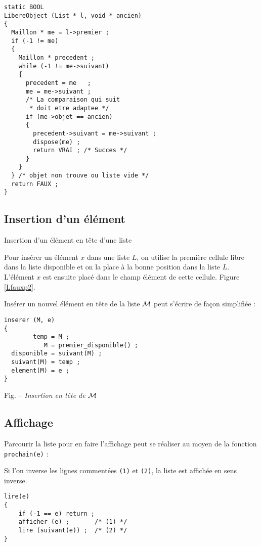 \begin{multicols}{2}
\begin{verbatim}  
static BOOL
LibereObject (List * l, void * ancien)
{   
  Maillon * me = l->premier ;
  if (-1 != me)
  {
    Maillon * precedent ;
    while (-1 != me->suivant)
    {
      precedent = me   ;
      me = me->suivant ;
      /* La comparaison qui suit
       * doit etre adaptee */
      if (me->objet == ancien)
      {
        precedent->suivant = me->suivant ;
        dispose(me) ;
        return VRAI ; /* Succes */
      }
    }
  } /* objet non trouve ou liste vide */
  return FAUX ;
}   \end{verbatim} 


\subsection*{Insertion d'un \'el\'ement}

 {Insertion d'un \'el\'ement en t\^ete d'une
liste}

      Pour ins\'erer un \'el\'ement $x$ dans une liste $L$, on utilise la
    premi\`ere cellule libre dans la liste disponible et on la place \`a la
    bonne position dans la liste $L$.  L'\'el\'ement $x$ est ensuite plac\'e
    dans le champ \'el\'ement de cette cellule. Figure \ref{Lfauxp2}.

	  Ins\'erer un nouvel \'el\'ement en t\^ete de la liste ${\cal M}$ peut
          s'\'ecrire de fa\c con simplifi\'ee :

\begin{verbatim}  
inserer (M, e)
{
        temp = M ;
           M = premier_disponible() ;
  disponible = suivant(M) ;
  suivant(M) = temp ;
  element(M) = e ;
}
\end{verbatim}

\begin{figurette}
    
\medskip
\centerline{{\sc Fig.} \thesubsection -- {\it Insertion en t\^ete de ${\cal M}$}}
	\label{Lfauxp2}
\end{figurette} 

\subsection*{Affichage}

Parcourir la liste pour en faire l'affichage peut se r\'ealiser au moyen de la
fonction {\tt prochain(e)} :

Si l'on inverse les lignes comment\'ees {\tt (1)} et {\tt (2)}, la liste est
affich\'ee en sens inverse.

\begin{verbatim}  
lire(e)
{
    if (-1 == e) return ;
    afficher (e) ;       /* (1) */
    lire (suivant(e)) ;  /* (2) */
}
\end{verbatim}

\newpage
~
\end{multicols}
